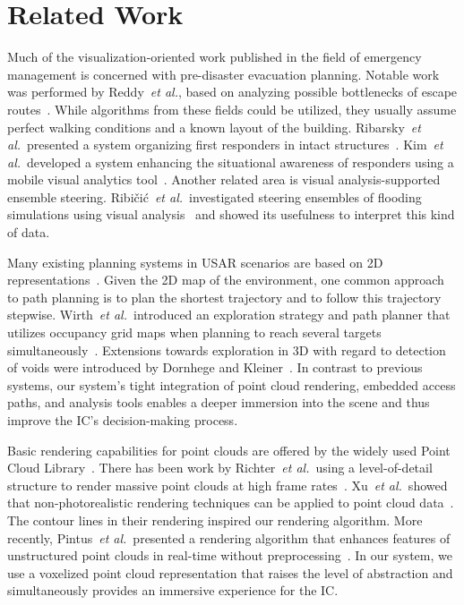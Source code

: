 \documentclass[conference,10pt,letter]{IEEEtran}
\def\IC{IC}
\def\etal{\textit{et al.}}
\begin{document}

\section{Related Work} \label{sec:relatedwork}
 Much of the visualization-oriented work published in the field of emergency management is concerned with pre-disaster evacuation planning. Notable work was performed by Reddy~\etal, based on analyzing possible bottlenecks of escape routes~\cite{EuroVA12:13-17:2012}. While algorithms from these fields could be utilized, they usually assume perfect walking conditions and a known layout of the building. Ribarsky~\etal\ presented a system organizing first responders in intact structures~\cite{Ribarsky:2010}. Kim~\etal\ developed a system enhancing the situational awareness of responders using a mobile visual analytics tool~\cite{Kim:2008}. Another related area is visual analysis-supported ensemble steering. Ribi\v{c}i\'c~\etal\ investigated steering ensembles of flooding simulations using visual analysis~\cite{6280550} and showed its usefulness to interpret this kind of data.

Many existing planning systems in USAR scenarios are based on 2D representations~\cite{kleiner_et_al_ssrr09,Pellenz2009SMU}. Given the 2D map of the environment, one common approach to path planning is to plan the shortest trajectory and to follow this trajectory stepwise. Wirth~\etal\ introduced an exploration strategy and path planner that utilizes occupancy grid maps when planning to reach several targets simultaneously~\cite{Wirth2007ETA1}. Extensions towards exploration in 3D with regard to detection of voids were introduced by Dornhege and Kleiner~\cite{dornhege2011frontier}. In contrast to previous systems, our system's tight integration of point cloud rendering, embedded access paths, and analysis tools enables a deeper immersion into the scene and thus improve the \IC 's decision-making process. 

 Basic rendering capabilities for point clouds are offered by the widely used Point Cloud Library~\cite{Rusu11ICRA}. There has been work by Richter~\etal\ using a level-of-detail structure to render massive point clouds at high frame rates~\cite{Richter:2010:ORV:1811158.1811178}. Xu~\etal\ showed that non-photorealistic rendering techniques can be applied to point cloud data~\cite{conf/npar/XuC04}. The contour lines in their rendering inspired our rendering algorithm. More recently, Pintus~\etal\ presented a rendering algorithm that enhances features of unstructured point clouds in real-time without preprocessing~\cite{Pintus:2011:RRM:2384495.2384513}. In our system, we use a voxelized point cloud representation that raises the level of abstraction and simultaneously provides an immersive experience for the \IC .
\end{document}
